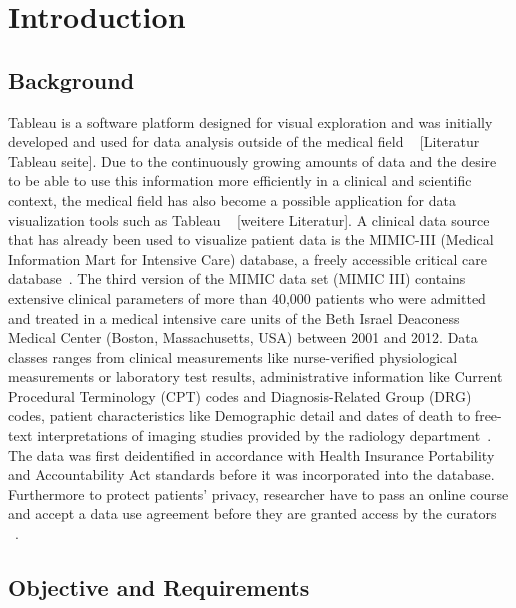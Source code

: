 \documentclass[aac,crcready]{iosart2x}
\begin{document}

\section{Introduction}\label{s1}

\subsection{Background}\label{s1.1}
\noindent Tableau is a software platform designed for visual exploration and was initially developed and used for
data analysis outside of the medical field ~\cite{Ko.2017} [Literatur Tableau seite]. Due to the continuously growing
amounts of data and the desire to be able to use this information more efficiently in a clinical and
scientific context, the medical field has also become a possible application for data visualization tools
such as Tableau ~\cite{Ko.2017} [weitere Literatur]. A clinical data source that has already been used to visualize patient data is the MIMIC-III (Medical Information Mart for Intensive Care) database, a freely accessible critical care database~\cite{Festag.2019,Lee.2016,Johnson.2020,Johnson.2016}. The third version of the MIMIC data set (MIMIC III) contains extensive clinical parameters of more than 40,000 patients who were admitted and treated in a medical intensive care units of the Beth Israel Deaconess Medical Center (Boston, Massachusetts, USA) between 2001 and 2012. Data classes ranges from clinical measurements like nurse-verified physiological measurements or laboratory test results, administrative
information like Current Procedural Terminology (CPT) codes and Diagnosis-Related Group (DRG) codes, patient characteristics like Demographic detail and dates of death to free-text interpretations of imaging studies provided by the radiology department~\cite{Johnson.2020,Johnson.2016}. The data was first deidentified in accordance with Health Insurance Portability and Accountability Act standards before it was incorporated into the database. Furthermore to protect patients’ privacy, researcher have to pass an online course and accept a data use agreement before they are granted access by the curators ~\cite{Johnson.2020,Johnson.2016}.


\subsection{Objective and Requirements}\label{s1.2}
\end{document}
